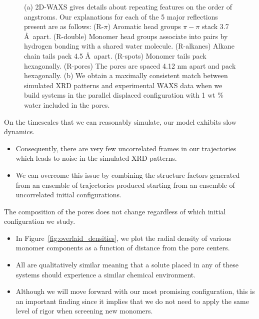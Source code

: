 \documentclass{article}
\begin{document}
\begin{figure}[!htb]
\begin{subfigure}{0.49\linewidth}
	\end{subfigure}
    \caption{(a) 2D-WAXS gives details about repeating features on the order of
    angstroms. Our explanations for each of the 5 major reflections present are
    as follows: (R-$\pi$) Aromatic head groups $\pi-\pi$ stack 3.7 \AA~apart. 
    (R-double) Monomer head groups associate into pairs by hydrogen bonding with
    a shared water molecule. (R-alkanes) Alkane chain tails pack 4.5 \AA~apart. 
    (R-spots) Monomer tails pack hexagonally. (R-pores) The pores are spaced 
    4.12 nm apart and pack hexagonally. (b) We obtain a maximally consistent
    match between simulated XRD patterns and experimental WAXS data when we
    build systems in the parallel displaced configuration with 1 wt \% water
    included in the pores.}\label{fig:WAXS_comparison}
 \end{figure}
 
  \noindent On the timescales that we can reasonably simulate, our model
  exhibits slow dynamics. 
  \begin{itemize}
    \item Consequently, there are very few uncorrelated frames in our 
    trajectories which leads to noise in the simulated XRD patterns. 
    \item We can overcome this issue by combining the structure factors
    generated from an ensemble of trajectories produced starting from 
    an ensemble of uncorrelated initial configurations.
  \end{itemize}
 
  \noindent The composition of the pores does not change regardless of which
  initial configuration we study.
  \begin{itemize}
    \item In Figure~\ref{fig:overlaid_densities}, we plot the radial density
    of various monomer components as a function of distance from the pore
    centers. 
    \item All are qualitatively similar meaning that a solute placed in 
    any of these systems should experience a similar chemical environment.
    \item Although we will move forward with our most promising configuration,
    this is an important finding since it implies that we do not need to apply
    the same level of rigor when screening new monomers.
  \end{itemize}
  
\end{document}
